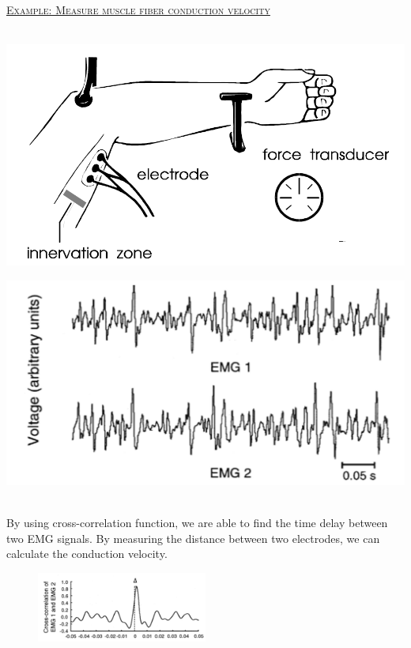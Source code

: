 \documentclass[12pt,a4paper]{article}
\begin{document}
 \begin{tcolorbox}[breakable]
 \underline{\textsc{Example: Measure muscle fiber conduction velocity}}\\\\
 \begin{minipage}{0.4\textwidth}
 \includegraphics[width=\textwidth]{images/emg3}
 \end{minipage}\hfill
 \begin{minipage}{0.4\textwidth}
 \includegraphics[width=\textwidth]{images/emg1}
 \end{minipage}
\ \\
 By using cross-correlation function, we are able to find the time delay between two EMG signals. By measuring the distance between two electrodes, we can calculate the conduction velocity.
 \begin{figure}[H] \centering
  \includegraphics[width=0.5\textwidth]{images/emg2}
\end{figure}
\end{tcolorbox}
 
\end{document}
